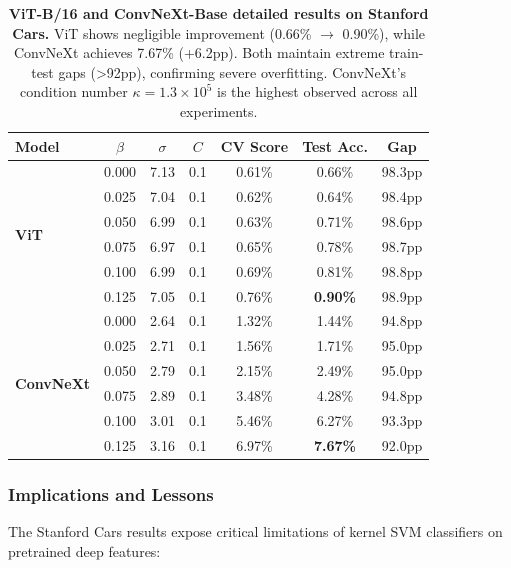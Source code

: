 \documentclass[11pt]{article}
\begin{document}
\begin{table}[h]
\centering
\caption{\textbf{ViT-B/16 and ConvNeXt-Base detailed results on Stanford Cars.} ViT shows negligible improvement (0.66\% $\to$ 0.90\%), while ConvNeXt achieves 7.67\% (+6.2pp). Both maintain extreme train-test gaps (>92pp), confirming severe overfitting. ConvNeXt's condition number $\kappa = 1.3 \times 10^5$ is the highest observed across all experiments.}
\label{tab:cars_vit_convnext_detail}
\begin{tabular}{lcccccc}
\toprule
\textbf{Model} & $\beta$ & $\sigma$ & $C$ & CV Score & Test Acc. & Gap \\
\midrule
\multirow{6}{*}{\textbf{ViT}} & 0.000 & 7.13 & 0.1 & 0.61\% & 0.66\% & 98.3pp \\
 & 0.025 & 7.04 & 0.1 & 0.62\% & 0.64\% & 98.4pp \\
 & 0.050 & 6.99 & 0.1 & 0.63\% & 0.71\% & 98.6pp \\
 & 0.075 & 6.97 & 0.1 & 0.65\% & 0.78\% & 98.7pp \\
 & 0.100 & 6.99 & 0.1 & 0.69\% & 0.81\% & 98.8pp \\
 & 0.125 & 7.05 & 0.1 & 0.76\% & \textbf{0.90\%} & 98.9pp \\
\midrule
\multirow{6}{*}{\textbf{ConvNeXt}} & 0.000 & 2.64 & 0.1 & 1.32\% & 1.44\% & 94.8pp \\
 & 0.025 & 2.71 & 0.1 & 1.56\% & 1.71\% & 95.0pp \\
 & 0.050 & 2.79 & 0.1 & 2.15\% & 2.49\% & 95.0pp \\
 & 0.075 & 2.89 & 0.1 & 3.48\% & 4.28\% & 94.8pp \\
 & 0.100 & 3.01 & 0.1 & 5.46\% & 6.27\% & 93.3pp \\
 & 0.125 & 3.16 & 0.1 & 6.97\% & \textbf{7.67\%} & 92.0pp \\
\bottomrule
\end{tabular}
\end{table}

\subsubsection{Implications and Lessons}

The Stanford Cars results expose critical limitations of kernel SVM classifiers on pretrained deep features:
\end{document}
